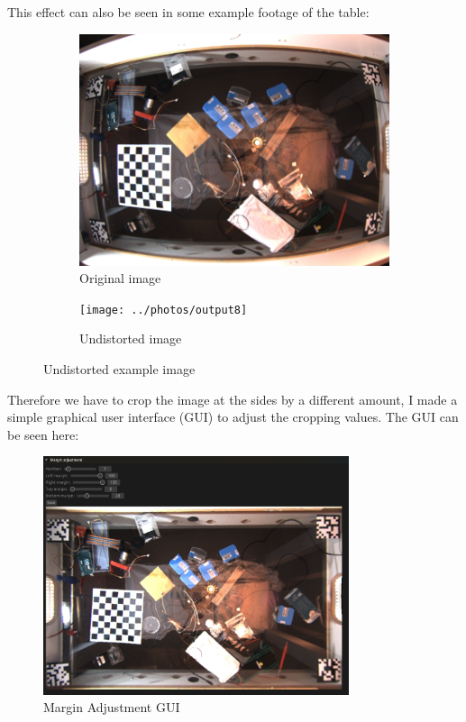 This effect can also be seen in some example footage of the table:
\begin{figure}[H]
    \centering
    \begin{subfigure}{.5\textwidth}
        \centering
        \includegraphics[width=.8\textwidth]{../photos/original_example8}
        \caption[originalRainbow]{Original image}
        \label{fig:original_example8}
    \end{subfigure}%
    \begin{subfigure}{.5\textwidth}
        \centering
        \texttt{[image: ../photos/output8]}
        \caption[originalRainbow]{Undistorted image}
        \label{fig:undistorted_example8}
    \end{subfigure}
    \caption{Undistorted example image}
    \label{fig:original_undistorted_example}
\end{figure}
Therefore we have to crop the image at the sides by a different amount, I made a simple graphical user interface (GUI) to adjust the cropping values.
The GUI can be seen here:
\begin{figure}[H]
    \centering
    \includegraphics[width=0.8\textwidth]{../photos/margin_adj_gui}
    \caption[marginadjgui]{Margin Adjustment GUI}
    \label{fig:margin_adj_gui}
\end{figure}
